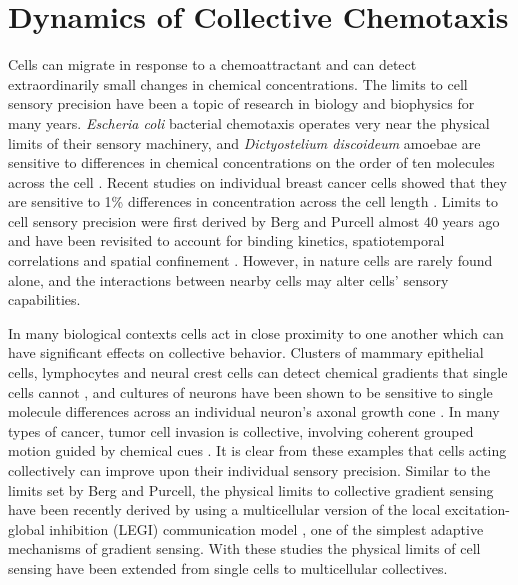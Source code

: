 
\chapter{Dynamics of Collective Chemotaxis}

Cells can migrate in response to a chemoattractant and can detect extraordinarily small changes in chemical concentrations. The limits to cell sensory precision have been a topic of research in biology and biophysics for many years. \textit{Escheria coli} bacterial chemotaxis operates very near the physical limits of their sensory machinery, and \textit{Dictyostelium discoideum} amoebae are sensitive to differences in chemical concentrations on the order of ten molecules across the cell \cite{berg1977physics,song2006dictyostelium}. Recent studies on individual breast cancer cells showed that they are sensitive to 1\% differences in concentration across the cell length \cite{shields2007autologous}. Limits to cell sensory precision were first derived by Berg and Purcell almost 40 years ago \cite{berg1977physics} and have been revisited to account for binding kinetics, spatiotemporal correlations and spatial confinement \cite{bialek2005physical, kaizu2014berg, bicknell2015limits}. However, in nature cells are rarely found alone, and the interactions between nearby cells may alter cells' sensory capabilities.

In many biological contexts cells act in close proximity to one another which can have significant effects on collective behavior. Clusters of mammary epithelial cells, lymphocytes and neural crest cells can detect chemical gradients that single cells cannot \cite{ellison2016cell,malet2015collective,theveneau2010collective}, and cultures of neurons have been shown to be sensitive to single molecule differences across an individual neuron's axonal growth cone \cite{rosoff2004new}. In many types of cancer, tumor cell invasion is collective, involving coherent grouped motion guided by chemical cues \cite{cheung2013collective, friedl2012classifying, aceto2014circulating, puliafito2015three}. It is clear from these examples that cells acting collectively can improve upon their individual sensory precision. Similar to the limits set by Berg and Purcell, the physical limits to collective gradient sensing have been recently derived \cite{mugler2016limits,ellison2016cell} by using a multicellular version of the local excitation-global inhibition (LEGI) communication model \cite{levchenko2002models}, one of the simplest adaptive mechanisms of gradient sensing. With these studies the physical limits of cell sensing have been extended from single cells to multicellular collectives.

